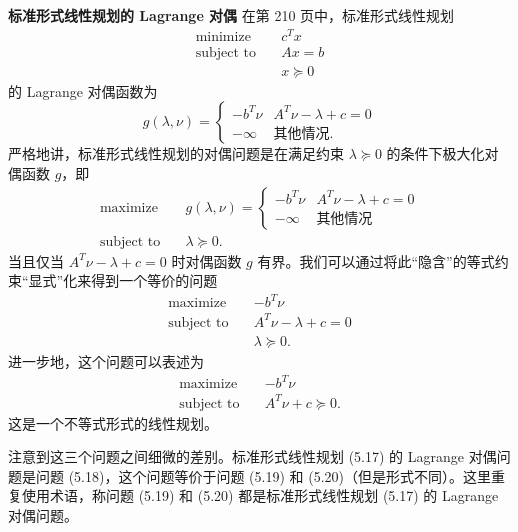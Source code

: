 \documentclass[UTF8,12pt,a4paper,fontset=fandol]{ctexart}
\begin{document}
\noindent\textbf{标准形式线性规划的 Lagrange 对偶}\quad
在第 210 页中，标准形式线性规划
\begin{equation}
\begin{aligned}
\text{minimize}\quad & c^Tx\\
\text{subject to}\quad & Ax=b\\
& x\succeq 0
\end{aligned}
\tag{5.17}
\end{equation}
的 Lagrange 对偶函数为
\[
g(\lambda,\nu)=
\begin{cases}
-b^T\nu & A^T\nu-\lambda+c=0\\
-\infty & \text{其他情况}.
\end{cases}
\]
严格地讲，标准形式线性规划的对偶问题是在满足约束 $\lambda\succeq 0$ 的条件下极大化对偶函数 $g$，即
\begin{equation}
\begin{aligned}
\text{maximize}\quad & g(\lambda,\nu)=
\begin{cases}
-b^T\nu & A^T\nu-\lambda+c=0\\
-\infty & \text{其他情况}
\end{cases}\\
\text{subject to}\quad & \lambda\succeq 0.
\end{aligned}
\tag{5.18}
\end{equation}
当且仅当 $A^T\nu-\lambda+c=0$ 时对偶函数 $g$ 有界。我们可以通过将此``隐含''的等式约束``显式''化来得到一个等价的问题
\begin{equation}
\begin{aligned}
\text{maximize}\quad & -b^T\nu\\
\text{subject to}\quad & A^T\nu-\lambda+c=0\\
& \lambda\succeq 0.
\end{aligned}
\tag{5.19}
\end{equation}
进一步地，这个问题可以表述为
\begin{equation}
\begin{aligned}
\text{maximize}\quad & -b^T\nu\\
\text{subject to}\quad & A^T\nu+c\succeq 0.
\end{aligned}
\tag{5.20}
\end{equation}
这是一个不等式形式的线性规划。

注意到这三个问题之间细微的差别。标准形式线性规划 (5.17) 的 Lagrange 对偶问题是问题 (5.18)，这个问题等价于问题 (5.19) 和 (5.20)（但是形式不同）。这里重复使用术语，称问题 (5.19) 和 (5.20) 都是标准形式线性规划 (5.17) 的 Lagrange 对偶问题。
\end{document}
